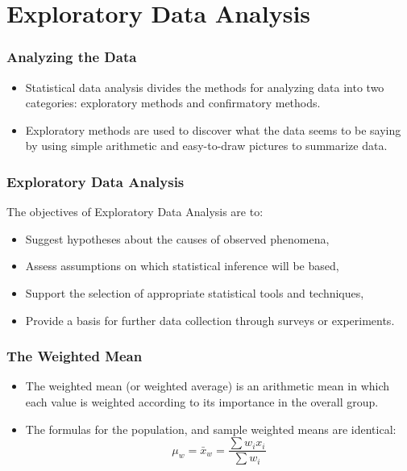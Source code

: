 \documentclass{beamer}
\begin{document}
\section*{Exploratory Data Analysis}

\begin{frame}

\frametitle{Analyzing the Data}
\Large
\vspace{-1cm}
\begin{itemize}
\item Statistical data analysis divides the methods for analyzing data into two categories: exploratory methods and confirmatory methods. 

\item Exploratory methods are used to discover what the data seems to be saying by using simple arithmetic and easy-to-draw pictures to summarize data. 
\end{itemize}
\end{frame}

\begin{frame}
\frametitle{Exploratory Data Analysis}
\Large
\vspace{-1cm}
The objectives of Exploratory Data Analysis are to:
\begin{itemize}
\item Suggest hypotheses about the causes of observed phenomena,
\item Assess assumptions on which statistical inference will be based,
\item Support the selection of appropriate statistical tools and techniques,
\item Provide a basis for further data collection through surveys or experiments.
\end{itemize}
\end{frame}
\begin{frame}
\frametitle{The Weighted Mean}
\Large
\vspace{-0.7cm}
\begin{itemize}
\item  The weighted mean (or weighted average) is an arithmetic mean in which each value is weighted according
to its importance in the overall group. 
\vspace{0.4cm}
\item The formulas for the population, and sample weighted means are
identical:
\[ \mu_w = \bar{x}_w =\frac{\sum w_i x_i}{\sum w_i} \]
\end{itemize}
 
\end{frame}
\end{document}
